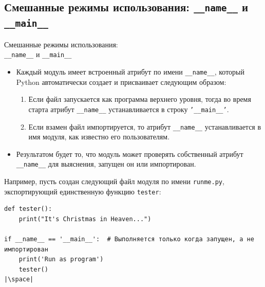 \documentclass[aspectratio=169, mathserif]{beamer}	%
\begin{document}
\subsection{Смешанные режимы использования: \texttt{\_\_name\_\_} и \texttt{\_\_main\_\_}}
\begin{frame}[fragile]{Смешанные режимы использования:  \\ \texttt{\_\_name\_\_} и \texttt{\_\_main\_\_}}
\scriptsize
\begin{itemize}
	\item Каждый модуль имеет встроенный атрибут по имени \texttt{\_\_name\_\_}, который
	Python автоматически создает и присваивает следующим образом:
	\begin{enumerate}
		\scriptsize
		\item  Если файл запускается как программа верхнего уровня, тогда во время старта атрибут \texttt{\_\_name\_\_} устанавливается в строку \texttt{'\_\_main\_\_'}.

		\item  Если взамен файл импортируется, то атрибут \texttt{\_\_name\_\_} устанавливается в имя модуля, как известно его пользователям.
	\end{enumerate}
	\item Результатом будет то, что модуль может проверять собственный атрибут \texttt{\_\_name\_\_} для выяснения, запущен он или импортирован.
\end{itemize}
\vfill
Например, пусть создан следующий файл модуля по имени \texttt{runme.ру}, экспортирующий единственную функцию \texttt{tester}:
\vfill
\begin{verbatim}
def tester():
    print("It's Christmas in Heaven...")

if __name__ == '__main__':  # Выполняется только когда запущен, а не импортирован
    print('Run as program')
    tester()
|\space|
\end{verbatim}
\vfill
\end{frame}
\end{document}
